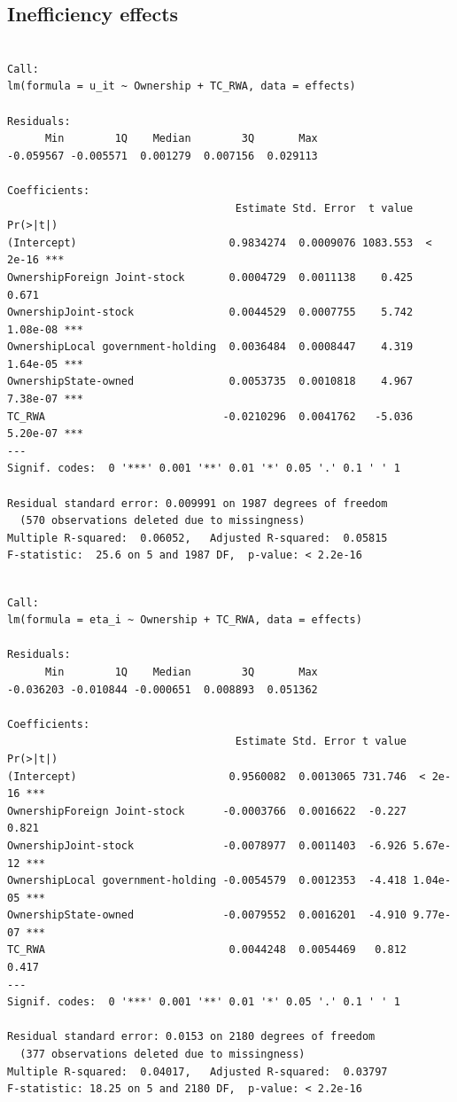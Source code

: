 \documentclass[
  letterpaper,
  DIV=11,
  numbers=noendperiod]{scrreprt}
\begin{document}
\subsection{Inefficiency effects}\label{inefficiency-effects}

\begin{verbatim}

Call:
lm(formula = u_it ~ Ownership + TC_RWA, data = effects)

Residuals:
      Min        1Q    Median        3Q       Max 
-0.059567 -0.005571  0.001279  0.007156  0.029113 

Coefficients:
                                    Estimate Std. Error  t value Pr(>|t|)    
(Intercept)                        0.9834274  0.0009076 1083.553  < 2e-16 ***
OwnershipForeign Joint-stock       0.0004729  0.0011138    0.425    0.671    
OwnershipJoint-stock               0.0044529  0.0007755    5.742 1.08e-08 ***
OwnershipLocal government-holding  0.0036484  0.0008447    4.319 1.64e-05 ***
OwnershipState-owned               0.0053735  0.0010818    4.967 7.38e-07 ***
TC_RWA                            -0.0210296  0.0041762   -5.036 5.20e-07 ***
---
Signif. codes:  0 '***' 0.001 '**' 0.01 '*' 0.05 '.' 0.1 ' ' 1

Residual standard error: 0.009991 on 1987 degrees of freedom
  (570 observations deleted due to missingness)
Multiple R-squared:  0.06052,   Adjusted R-squared:  0.05815 
F-statistic:  25.6 on 5 and 1987 DF,  p-value: < 2.2e-16
\end{verbatim}

\begin{verbatim}

Call:
lm(formula = eta_i ~ Ownership + TC_RWA, data = effects)

Residuals:
      Min        1Q    Median        3Q       Max 
-0.036203 -0.010844 -0.000651  0.008893  0.051362 

Coefficients:
                                    Estimate Std. Error t value Pr(>|t|)    
(Intercept)                        0.9560082  0.0013065 731.746  < 2e-16 ***
OwnershipForeign Joint-stock      -0.0003766  0.0016622  -0.227    0.821    
OwnershipJoint-stock              -0.0078977  0.0011403  -6.926 5.67e-12 ***
OwnershipLocal government-holding -0.0054579  0.0012353  -4.418 1.04e-05 ***
OwnershipState-owned              -0.0079552  0.0016201  -4.910 9.77e-07 ***
TC_RWA                             0.0044248  0.0054469   0.812    0.417    
---
Signif. codes:  0 '***' 0.001 '**' 0.01 '*' 0.05 '.' 0.1 ' ' 1

Residual standard error: 0.0153 on 2180 degrees of freedom
  (377 observations deleted due to missingness)
Multiple R-squared:  0.04017,   Adjusted R-squared:  0.03797 
F-statistic: 18.25 on 5 and 2180 DF,  p-value: < 2.2e-16
\end{verbatim}
\end{document}
